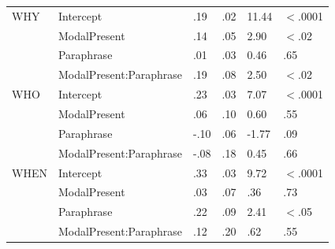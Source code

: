 \documentclass[12pt,letterpaper,table,svgnames,dvipsnames]{article}
\begin{document}
\begin{table}[p!]
\begin{center}
\begin{tabular}{llllll}


\midrule
WHY & Intercept & .19 & .02 & 11.44 & $<$.0001\\
{} & ModalPresent & .14 & .05 & 2.90 & $<$.02\\
{} & Paraphrase & .01 & .03 & 0.46 & .65\\
{} & ModalPresent:Paraphrase & .19 & .08 & 2.50 & $<$.02\\



\midrule
WHO & Intercept & .23 & .03 & 7.07 & $<$.0001\\
{} & ModalPresent & .06 & .10 & 0.60 & .55\\
{} & Paraphrase & -.10 & .06 & -1.77 & .09\\
{} & ModalPresent:Paraphrase & -.08 & .18 & 0.45 & .66\\



\midrule
WHEN & Intercept & .33 & .03 & 9.72 & $<$.0001\\
{} & ModalPresent & .03 & .07 & .36 & .73\\
{} & Paraphrase & .22 & .09 & 2.41 & $<$.05\\
{} & ModalPresent:Paraphrase & .12 & .20 & .62 & .55\\


\end{tabular}
\end{center}
\end{table}
\end{document}
